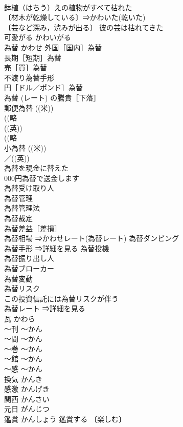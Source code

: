 \documentclass[8pt]{extreport}
\begin{document}
\begin{CJK}{UTF8}{min}
\\	鉢植（はちう）えの植物がすべて枯れた 
\\	〔材木が乾燥している〕⇒かわいた(乾いた) 
\\	〔芸など深み，渋みが出る〕 彼の芸は枯れてきた 
\\	可愛がる	かわいがる	
\\	為替	かわせ	外国［国内］為替 
\\	長期［短期］為替 
\\	売［買］為替 
\\	不渡り為替手形 
\\	円［ドル／ポンド］為替 
\\	為替 (レート) の騰貴［下落］ 
\\	郵便為替 ((米))
\\	((略
\\	((英))
\\	((略
\\	小為替 ((米))
\\	／((英))
\\	為替を現金に替えた 
\\	000円為替で送金します 
\\	為替受け取り人 
\\	為替管理 
\\	為替管理法 
\\	為替裁定 
\\	為替差益［差損］ 
\\	為替相場 ⇒かわせレート(為替レート) 為替ダンピング 
\\	為替手形 ⇒詳細を見る 為替投機 
\\	為替振り出し人 
\\	為替ブローカー 
\\	為替変動 
\\	為替リスク 
\\	この投資信託には為替リスクが伴う 
\\	為替レート ⇒詳細を見る
\\	瓦	かわら	
\\	～刊	～かん	
\\	～間	～かん	
\\	～巻	～かん	
\\	～館	～かん	
\\	～感	～かん	
\\	換気	かんき	
\\	感激	かんげき	
\\	関西	かんさい	
\\	元日	がんじつ	
\\	鑑賞	かんしょう	鑑賞する 〔楽しむ〕

\end{CJK}
\end{document}
